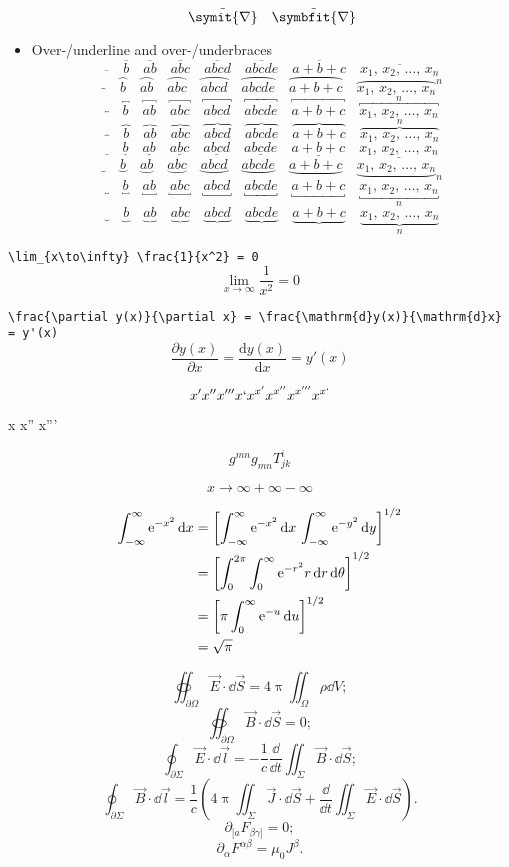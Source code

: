 \documentclass{article}
\def\OVERUNDERLINE#1{%
  #1{} \quad #1{b} \quad #1{ab} \quad #1{abc} \quad #1{abcd} \quad #1{abcde} \quad #1{a+b+c}}
\def\LISTTEXT{x_1, \, x_2, \, \ldots, \, x_n}
\begin{document}
\begin{itemize}
\[          \tilde{\symit{\nabla}} \quad \tilde{\symbfit{\nabla}}
        \]
  \item Over-/underline and over-/underbraces
        \[ \OVERUNDERLINE{\overline}     \quad \overline     {\LISTTEXT}   \]
        \[ \OVERUNDERLINE{\overparen}    \quad \overparen    {\LISTTEXT}^n \]
        \[ \OVERUNDERLINE{\overbracket}  \quad \overbracket  {\LISTTEXT}^n \]
        \[ \OVERUNDERLINE{\overbrace}    \quad \overbrace    {\LISTTEXT}^n \]
        \[ \OVERUNDERLINE{\underline}    \quad \underline    {\LISTTEXT}   \]
        \[ \OVERUNDERLINE{\underparen}   \quad \underparen   {\LISTTEXT}_n \]
        \[ \OVERUNDERLINE{\underbracket} \quad \underbracket {\LISTTEXT}_n \]
        \[ \OVERUNDERLINE{\underbrace}   \quad \underbrace   {\LISTTEXT}_n \]
\end{itemize}

\verb|\lim_{x\to\infty} \frac{1}{x^2} = 0|
\[ \lim_{x\to\infty} \frac{1}{x^2} = 0 \]

\verb|\frac{\partial y(x)}{\partial x} = \frac{\mathrm{d}y(x)}{\mathrm{d}x} = y'(x)|
\[ \frac{\partial y(x)}{\partial x} = \frac{\mathrm{d}y(x)}{\mathrm{d}x} = y'(x) \]

\[ x' x'' x''' x` x^{x'} x^{x''} x^{x'''} x^{x`}\]

{x x'' x'''}

\[ g^{mn} g_{mn} T^{i}_{jk} \]

\[ x \to \infty + \infty - \infty \]

\def\ee{\mathrm{e}}
\begin{align*}
     \int_{-\infty}^\infty \ee^{-x^2} \dd{x}
  &= \qty[\int_{-\infty}^\infty \ee^{-x^2} \dd{x} \, \int_{-\infty}^\infty \ee^{-y^2} \dd{y}]^{1/2} \\
  &= \qty[\int_0^{2\pi} \int_0^\infty \ee^{-r^2} r \dd{r}\dd{\theta}]^{1/2} \\
  &= \qty[\pi \int_0^\infty \ee^{-u} \dd{u}]^{1/2} \\
  &= \sqrt{\pi}
\end{align*}

\[\oiint_{\partial\Omega}\vec{E}\cdot\dd{\vec S}=4\uppi \iint_{\Omega}\rho\dd{V};\]
\[\oiint_{\partial\Omega}\vec{B}\cdot\dd{\vec S}=0;\]
\[\oint_{\partial\Sigma}\vec E\cdot \dd{\vec{l}}=-\frac{1}{c}\frac{\dd}{\dd t}\iint_{\Sigma}\vec B \cdot \dd{\vec{S}};\]
\[\oint_{\partial\Sigma}\vec B\cdot \dd{\vec{l}}=\frac{1}{c}\left(4\uppi\iint_{\Sigma}\vec J\cdot \dd{\vec S}+\frac{\dd}{\dd t}\iint_{\Sigma}\vec E \cdot \dd{\vec{S}}\right).\]
\[\partial_{[a}F_{\beta\gamma]}=0;\]
\[\partial_\alpha F^{\alpha\beta}=\mu_0J^\beta.\]
\end{document}
